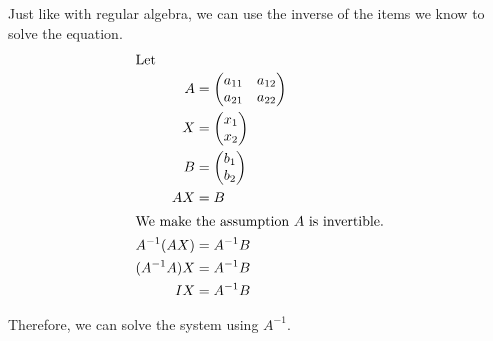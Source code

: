 \begin{blackbox}
  Just like with regular algebra, we can use the inverse of the items we know to solve the equation.
  \begin{align*}
    \intertext{Let}
    A &=
        \begin{pmatrix}
          a_{11} & a_{12} \\
          a_{21} & a_{22}
        \end{pmatrix} \\
    X &=
        \begin{pmatrix}
          x_{1} \\
          x_{2}
        \end{pmatrix} \\
    B &=
        \begin{pmatrix}
          b_{1} \\
          b_{2}
        \end{pmatrix} \\
    AX &= B \\
    \shortintertext{We make the assumption $A$ is invertible.}
    A^{-1} (A X) &= A^{-1} B \\
    (A^{-1} A) X &= A^{-1} B \\
    I X &= A^{-1} B
  \end{align*}

  Therefore, we can solve the system using $A^{-1}$.
\end{blackbox}


